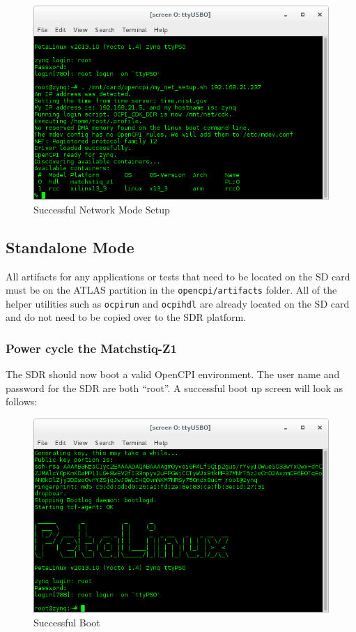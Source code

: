 \begin{figure}[H]
	\centerline{\includegraphics[scale=0.5]{Matchstiq_Z1_net_setup}}
	\caption{Successful Network Mode Setup}
	\label{fig:netsetup}
\end{figure}

\subsection{Standalone Mode}
All artifacts for any applications or tests that need to be located on the SD card must be on the ATLAS partition in the \texttt{opencpi/artifacts} folder.  All of the helper utilities such as \texttt{ocpirun} and \texttt{ocpihdl} are already located on the SD card and do not need to be copied over to the SDR platform.

\subsubsection*{Power cycle the Matchstiq-Z1}
The SDR should now boot a valid OpenCPI environment.  The user name and password for the SDR are both ``root''.  A successful boot up screen will look as follows:

\begin{figure}[ht]
	\centerline{\includegraphics[scale=0.5]{Matchstiq_Z1_login}}
	\caption{Successful Boot}
	\label{fig:boot2}
\end{figure}

